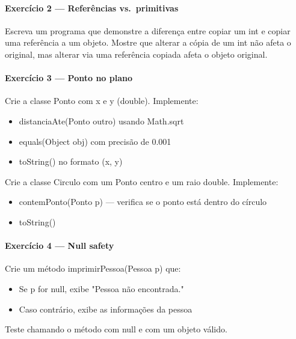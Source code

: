 \documentclass[11pt,a4paper]{article}
\renewcommand{\texttt}[1]{{\color{javaCodeInline}\small\ttfamily #1}}
\begin{document}
\paragraph{Exercício 2 --- Referências vs.\ primitivas}

Escreva um programa que demonstre a diferença entre copiar um \texttt{int} e copiar uma referência a um objeto. Mostre que alterar a cópia de um \texttt{int} não afeta o original, mas alterar via uma referência copiada afeta o objeto original.

\paragraph{Exercício 3 --- Ponto no plano}

Crie a classe \texttt{Ponto} com \texttt{x} e \texttt{y} (double). Implemente:
\begin{itemize}
\item \texttt{distanciaAte(Ponto outro)} usando \texttt{Math.sqrt}
\item \texttt{equals(Object obj)} com precisão de 0.001
\item \texttt{toString()} no formato \texttt{(x, y)}
\end{itemize}

Crie a classe \texttt{Circulo} com um \texttt{Ponto} centro e um raio \texttt{double}. Implemente:
\begin{itemize}
\item \texttt{contemPonto(Ponto p)} --- verifica se o ponto está dentro do círculo
\item \texttt{toString()}
\end{itemize}

\paragraph{Exercício 4 --- Null safety}

Crie um método \texttt{imprimirPessoa(Pessoa p)} que:
\begin{itemize}
\item Se \texttt{p} for \texttt{null}, exibe \texttt{"Pessoa não encontrada."}
\item Caso contrário, exibe as informações da pessoa
\end{itemize}
Teste chamando o método com \texttt{null} e com um objeto válido.
\end{document}
